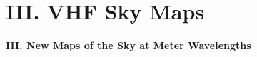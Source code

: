 \documentclass{beamer}
\begin{document}

\section{III. VHF Sky Maps}

{
    \begin{frame}[t]

        {\large \bfseries III. New Maps of the Sky at Meter Wavelengths}
    \end{frame}
}
\end{document}
